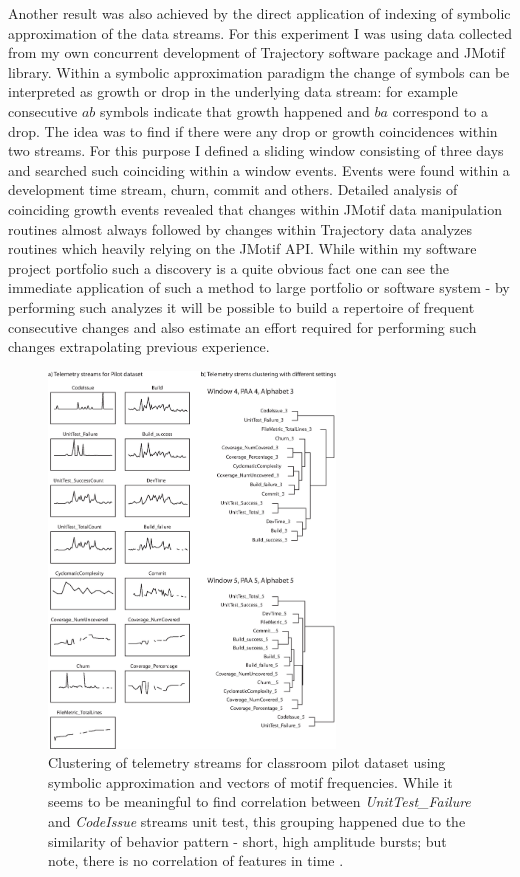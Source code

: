 \documentclass{sig-alternate}
\begin{document}
Another result was also achieved by the direct application of indexing of symbolic approximation of the data streams. For this experiment I was using data collected from my own concurrent development of Trajectory software package and JMotif library. Within a symbolic approximation paradigm the change of symbols can be interpreted as growth or drop in the underlying data stream: for example consecutive $ab$ symbols indicate that growth happened and $ba$ correspond to a drop. The idea was to find if there were any drop or growth coincidences within two streams. For this purpose I defined a sliding window consisting of three days and searched such coinciding within a window events. Events were found within a development time stream, churn, commit and others. Detailed analysis of coinciding growth events revealed that changes within JMotif data manipulation routines almost always followed by changes within Trajectory data analyzes routines which heavily relying on the JMotif API. While within my software project portfolio such a discovery is a quite obvious fact one can see the immediate application of such a method to large portfolio or software system - by performing such analyzes it will be possible to build a repertoire of frequent consecutive changes and also estimate an effort required for performing such changes extrapolating previous experience.

\begin{figure}[tbp]
   \centering
   \includegraphics[height=100mm]{cluster_streams.eps}
   \caption{Clustering of telemetry streams for classroom pilot dataset using symbolic approximation and vectors of motif frequencies. While it seems to be meaningful to find correlation between \textit{UnitTest\_Failure} and \textit{CodeIssue} streams unit test, this grouping happened due to the similarity of behavior pattern - short, high amplitude bursts; but note, there is no correlation of features in time .}
   \label{fig:cluster_streams}
\end{figure}
\end{document}
